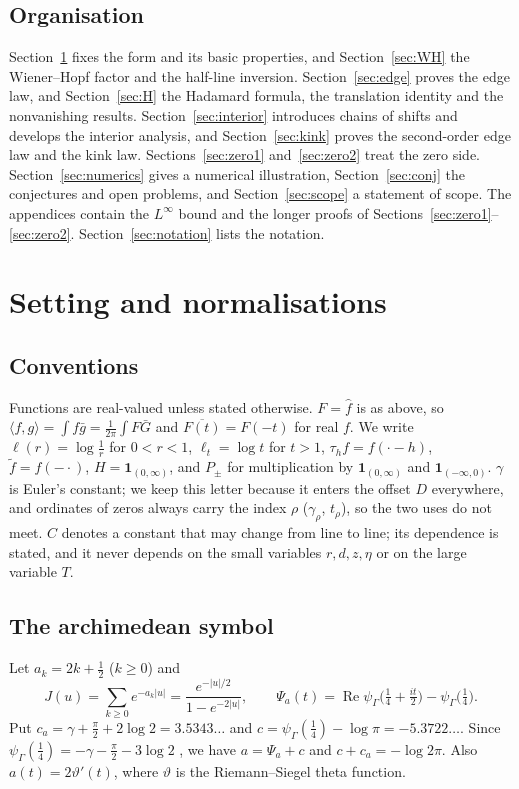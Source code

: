 \documentclass[11pt]{amsart}
\newcommand{\one}{\mathbf{1}}
\newcommand{\dig}{\psi_\Gamma}
\DeclareMathOperator{\re}{Re}
\theoremstyle{definition}
\theoremstyle{remark}
\numberwithin{equation}{section}
\begin{document}
\subsection*{Organisation}
Section~\ref{sec:setting} fixes the form and its basic properties, and Section~\ref{sec:WH} the Wiener--Hopf factor and the half-line inversion. Section~\ref{sec:edge} proves the edge law, and Section~\ref{sec:H} the Hadamard formula, the translation identity and the nonvanishing results. Section~\ref{sec:interior} introduces chains of shifts and develops the interior analysis, and Section~\ref{sec:kink} proves the second-order edge law and the kink law. Sections~\ref{sec:zero1} and~\ref{sec:zero2} treat the zero side. Section~\ref{sec:numerics} gives a numerical illustration, Section~\ref{sec:conj} the conjectures and open problems, and Section~\ref{sec:scope} a statement of scope. The appendices contain the $L^\infty$ bound and the longer proofs of Sections~\ref{sec:zero1}--\ref{sec:zero2}. Section~\ref{sec:notation} lists the notation.

\section{Setting and normalisations}\label{sec:setting}

\subsection{Conventions}\label{sec:conv}
Functions are real-valued unless stated otherwise. $F=\hat f$ is as above, so $\langle f,g\rangle=\int f\bar g=\frac1{2\pi}\int F\bar G$ and $\overline{F(t)}=F(-t)$ for real $f$. We write $\ell(r)=\log\frac1r$ for $0<r<1$, $\ell_t=\log t$ for $t>1$, $\tau_hf=f(\cdot-h)$, $\tilde f=f(-\cdot)$, $H=\one_{(0,\infty)}$, and $P_\pm$ for multiplication by $\one_{(0,\infty)}$ and $\one_{(-\infty,0)}$. $\gamma$ is Euler's constant; we keep this letter because it enters the offset $D$ everywhere, and ordinates of zeros always carry the index $\rho$ ($\gamma_\rho$, $t_\rho$), so the two uses do not meet. $C$ denotes a constant that may change from line to line; its dependence is stated, and it never depends on the small variables $r,d,z,\eta$ or on the large variable $T$.

\subsection{The archimedean symbol}\label{sec:symbol}
Let $a_k=2k+\frac12$ ($k\ge0$) and
\[
J(u)=\sum_{k\ge0}e^{-a_k|u|}=\frac{e^{-|u|/2}}{1-e^{-2|u|}},\qquad \Psi_a(t)=\re\dig\bigl(\tfrac14+\tfrac{it}2\bigr)-\dig\bigl(\tfrac14\bigr).
\]
Put $c_a=\gamma+\frac\pi2+2\log2=3.5343\ldots$ and $c=\dig(\frac14)-\log\pi=-5.3722\ldots$. Since $\dig(\frac14)=-\gamma-\frac\pi2-3\log2$ \cite[\S5.4]{DLMF}, we have $a=\Psi_a+c$ and $c+c_a=-\log2\pi$. Also $a(t)=2\vartheta'(t)$, where $\vartheta$ is the Riemann--Siegel theta function.
\end{document}
